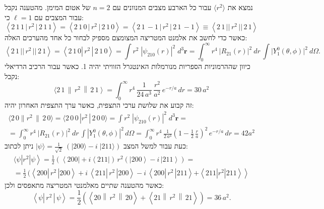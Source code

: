 \documentclass{tstextbook}
\begin{document}
\begin{example}
נמצא את \(\langle r^{2} \rangle\) עבור כל הארבע מצבים המנוונים עם \(n=2\) של אטום המימן. מהטענה נקבל עבור המצבים עם \(\ell=1\) כי:
$$\left\langle2\,1\,1\,{|}\,r^{2}\,{|}\,2\,1\,1\right\rangle=\left\langle2\,1\,0\,{|}\,r^{2}\,{|}\,2\,1\,0\right\rangle=\left\langle2\,1\,-1\,{|}\,r^{2}\,{|}\,2\,1\,-1\right\rangle\equiv\left\langle2\,1\,{\big|\big|}\,r^{2}\,{\big|\big|}\,2\,1\right\rangle$$
כאשר כדי לחשב את אלמנט המטריצה המצומצם מספיק לבחור כל אחד מהערכים האלה:
$$\left\langle2\,1\,{\big|\big|}\,r^{2}\,{\big|\big|}\,2\,1\right\rangle=\left\langle2\,1\,0\left|\,r^{2}\,\right|\,2\,1\,0\right\rangle=\int r^{2}\;|\psi_{210}(r)|^{2}\;d^{3}\mathbf{r}=\int_{0}^{\infty}r^{4}~|R_{21}(r)|^{2}~d r\,\int\Big|Y_{1}^{0}(\theta,\phi)\Big|^{2}~d\Omega.$$
כיוון שההרמוניות הספריות מנורמלות האינטגרל הזוויתי יהיה 1. כאשר עבור הרכיב הרדיאלי נקבל:
$$\langle2\,1\,\|\,r^{2}\,\left\|\,2\,1\right\rangle=\int_{0}^{\infty}r^{4}\,\frac{1}{24\,a^{3}}\,\frac{r^{2}}{a^{2}}\,e^{-r/a}\,d r=30\,a^{2}$$
זה קבוע את שלושת ערכי התצפית, כאשר ערך התצפית האחרון יהיה:
\begin{gather*}\langle 2\,0\|r^{2}\,\|\,2\,0 \rangle=\langle 2\,0\,0\,|r^{2}\,|\,2\,0\,0 \rangle=\int r^{2}\;|\psi_{210}(r)|^{2}\;d^{3}\mathbf{r}=\\=\int_{0}^{\infty}r^{4}~|R_{21}(r)|^{2}~d r\,\int\left|Y_{1}^{0}(\theta,\phi)\right|^{2}\,d\Omega= \int_{0}^{\infty}r^{4}\,{\frac{1}{2\,a^{3}}}\left(1-{\frac{1}{2}}\,{\frac{r}{a}}\right)^{2}\,e^{-r/a}\,d r= 42a^{2}
\end{gather*}
כעת עבור למשל המצב \(|\psi\rangle={\frac{1}{\sqrt{2}}}\;(|200\rangle-i\;|211\rangle)\) ניתן לכתוב:
\begin{gather*}\langle\psi\left|\left.r^{2}\right|\psi\right\rangle=\frac{1}{2}\left(\left\langle200\right|+i\left\langle211\right|\right)\,r^{2}\left(\left|200\right\rangle-i\,\left|211\right\rangle\right)= \\={\frac{1}{2}}\,(\left\langle200\left|\,r^{2}\,\right|200\right\rangle+i\,\left\langle211\left|\,r^{2}\,\right|200\right\rangle-i\,\left\langle200\left|\,r^{2}\,\right|211\right\rangle\left.+\left\langle211\left|\left.r^{2}\right|211\right\rangle\right\rangle\right.
\end{gather*}
כאשר מהטענה שתיים מאלמנטי המטריצה מתאפסים ולכן:
$$\left\langle\psi\left|\,r^{2}\,\right|\,\psi\right\rangle=\frac{1}{2}\left(\left\langle20\left\|\,r^{2}\,\right\|\,20\right\rangle+\left\langle21\left\|\,r^{2}\,\right\|\,21\right\rangle\right)=36\,a^{2}.$$

\end{example}
\end{document}
